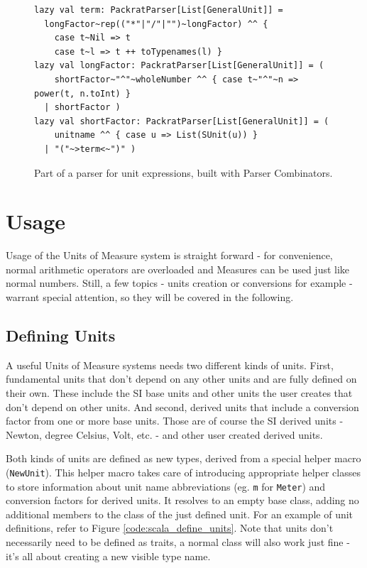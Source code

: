\documentclass[12pt,oneside,a4paper]{scrbook}
\begin{document}
\begin{figure}
\begin{verbatim}
lazy val term: PackratParser[List[GeneralUnit]] =
  longFactor~rep(("*"|"/"|"")~longFactor) ^^ {
    case t~Nil => t
    case t~l => t ++ toTypenames(l) }
lazy val longFactor: PackratParser[List[GeneralUnit]] = (
    shortFactor~"^"~wholeNumber ^^ { case t~"^"~n => power(t, n.toInt) }
  | shortFactor )
lazy val shortFactor: PackratParser[List[GeneralUnit]] = (
    unitname ^^ { case u => List(SUnit(u)) }
  | "("~>term<~")" )
\end{verbatim}
\caption{Part of a parser for unit expressions, built with Parser Combinators.}
\label{code:scala_parse}
\end{figure}

\chapter{Usage}

Usage of the Units of Measure system is straight forward - for convenience, normal arithmetic operators are overloaded and Measures can be used just like normal numbers. Still, a few topics - units creation or conversions for example - warrant special attention, so they will be covered in the following.

\section{Defining Units}

A useful Units of Measure systems needs two different kinds of units. First, fundamental units that don't depend on any other units and are fully defined on their own. These include the SI base units and other units the user creates that don't depend on other units. And second, derived units that include a conversion factor from one or more base units. Those are of course the SI derived units - Newton, degree Celsius, Volt, etc. - and other user created derived units.

Both kinds of units are defined as new types, derived from a special helper macro (\verb|NewUnit|). This helper macro takes care of introducing appropriate helper classes to store information about unit name abbreviations (eg. \verb|m| for \verb|Meter|) and conversion factors for derived units. It resolves to an empty base class, adding no additional members to the class of the just defined unit. For an example of unit definitions, refer to Figure \ref{code:scala_define_units}. Note that units don't necessarily need to be defined as traits, a normal class will also work just fine - it's all about creating a new visible type name.
\end{document}
